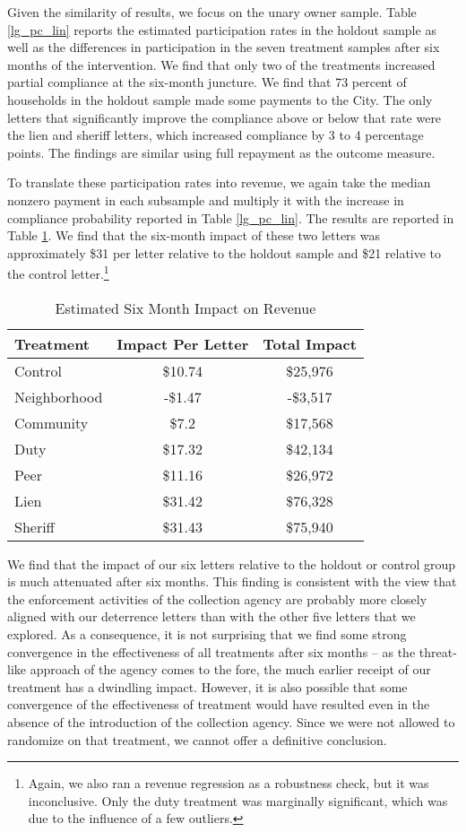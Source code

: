\documentclass[12pt]{article}
\begin{document}
Given the similarity of results, we focus on the unary owner sample.
Table \ref{lg_pc_lin} reports the estimated participation rates in the
holdout sample as well as the differences in participation in the
seven treatment samples after six months of the intervention.  We find
that only two of the treatments increased partial compliance at the
six-month juncture.  We find that 73 percent of households in the
holdout sample made some payments to the City. The only letters that
significantly improve the compliance above or below that rate were the
lien and sheriff letters, which increased compliance by 3 to 4
percentage points. The findings are similar using full repayment as
the outcome measure.

To translate these participation rates into revenue, we again take the
median nonzero payment in each subsample and multiply it with the
increase in compliance probability reported in Table \ref{lg_pc_lin}.
The results are reported in Table \ref{lg_rev}. We find that the
six-month impact of these two letters was approximately \$31 per
letter relative to the holdout sample and \$21 relative to the control
letter.\footnote{Again, we also ran a revenue regression as a
  robustness check, but it was inconclusive. Only the duty treatment
  was marginally significant, which was due to the influence of a few
  outliers.}

\begin{table}[htbp]
\caption{Estimated Six Month Impact on Revenue} \label{lg_rev}
\bigskip
\centering
\begin{tabular}{lcc}
  \hline
Treatment & Impact Per Letter & Total Impact \\ 
  \hline
Control & \$10.74 & \$25,976 \\ 
  Neighborhood & -\$1.47 & -\$3,517 \\ 
  Community & \$7.2 & \$17,568 \\ 
  Duty & \$17.32 & \$42,134 \\ 
  Peer & \$11.16 & \$26,972 \\ 
  Lien & \$31.42 & \$76,328 \\ 
  Sheriff & \$31.43 & \$75,940 \\ 
   \hline
\end{tabular}
\end{table}

We find that the impact of our six letters relative to the holdout or
control group is much attenuated after six months. This finding is
consistent with the view that the enforcement activities of the
collection agency are probably more closely aligned with our
deterrence letters than with the other five letters that we
explored. As a consequence, it is not surprising that we find some
strong convergence in the effectiveness of all treatments after six
months -- as the threat-like approach of the agency comes to the fore,
the much earlier receipt of our treatment has a dwindling impact.
However, it is also possible that some convergence of the
effectiveness of treatment would have resulted even in the absence of
the introduction of the collection agency. Since we were not allowed
to randomize on that treatment, we cannot offer a definitive
conclusion.
\end{document}
